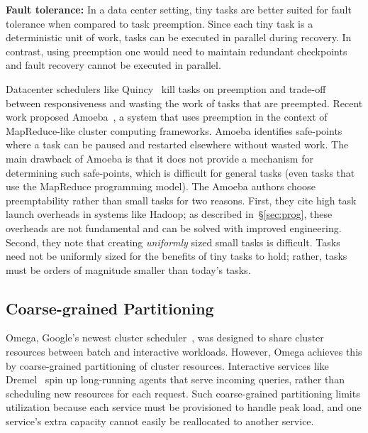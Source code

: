 
\vspace{4pt}\noindent\textbf{Fault tolerance:}
In a data center setting, tiny tasks are better suited for
fault tolerance when compared to task preemption. Since each tiny task is a
deterministic unit of work, tasks can be executed in parallel during recovery.
In contrast, using preemption one would need to maintain redundant checkpoints
and fault recovery cannot be executed in parallel.

Datacenter schedulers like Quincy~\cite{isard2009quincy} kill tasks on
preemption and trade-off between responsiveness and wasting the work of tasks
that are preempted.  Recent work proposed Amoeba~\cite{ananthanarayanan2012true},
a system that uses preemption in the context of MapReduce-like
cluster computing frameworks. Amoeba identifies safe-points where a task can be
paused and restarted elsewhere without wasted work. The main drawback of Amoeba
is that it does not provide a mechanism for determining such safe-points, which
is difficult for general tasks (even tasks that use the MapReduce programming
model).  The Amoeba authors choose preemptability rather than small tasks for
two reasons. First, they cite high task launch overheads in systems like
Hadoop; as described in~\S\ref{sec:prog}, these overheads are not fundamental
and can be solved with improved engineering. Second, they note that creating
\emph{uniformly} sized small tasks is difficult. Tasks need not be uniformly
sized for the benefits of tiny tasks to hold; rather, tasks must be orders of
magnitude smaller than today's tasks.

\subsection{Coarse-grained Partitioning}
Omega, Google's newest cluster scheduler~\cite{melnik2010dremel},
was designed to share cluster
resources between batch and interactive workloads. However, Omega achieves
this by coarse-grained partitioning of cluster resources.
Interactive services like Dremel~\cite{melnik2010dremel} spin up long-running
agents that serve incoming queries, rather than scheduling new resources for
each request.  Such coarse-grained partitioning limits utilization because each service
must be provisioned to handle peak load, and one service's extra capacity
cannot easily be reallocated to another service.

